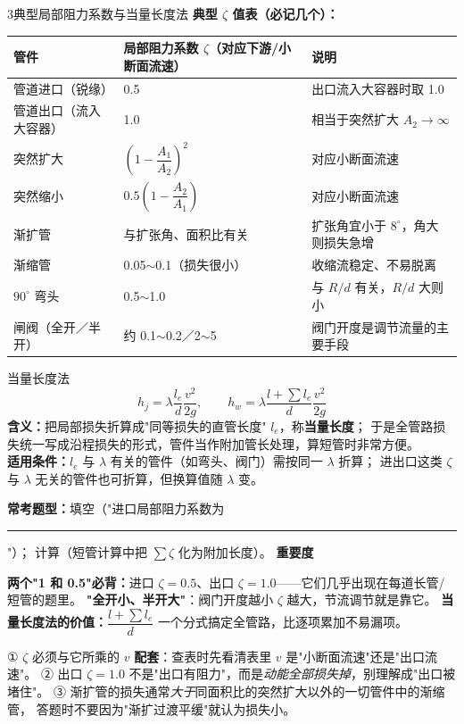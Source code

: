 \begin{kaodian}{3}{典型局部阻力系数与当量长度法}
\textbf{典型 $\zeta$ 值表（必记几个）：}
\begin{center}
\begin{tabularx}{\textwidth}{@{}lXX@{}}
\toprule
管件 & 局部阻力系数 $\zeta$（对应下游/小断面流速） & 说明 \\
\midrule
管道进口（锐缘） & 0.5 & 出口流入大容器时取 1.0 \\
管道出口（流入大容器） & 1.0 & 相当于突然扩大 $A_2\to\infty$ \\
突然扩大 & $\left(1-\dfrac{A_1}{A_2}\right)^2$ & 对应小断面流速 \\
突然缩小 & $0.5\left(1-\dfrac{A_2}{A_1}\right)$ & 对应小断面流速 \\
渐扩管 & 与扩张角、面积比有关 & 扩张角宜小于 $8^\circ$，角大则损失急增 \\
渐缩管 & 0.05$\sim$0.1（损失很小） & 收缩流稳定、不易脱离 \\
$90^\circ$ 弯头 & 0.5$\sim$1.0 & 与 $R/d$ 有关，$R/d$ 大则小 \\
闸阀（全开／半开） & 约 0.1$\sim$0.2／2$\sim$5 & 阀门开度是调节流量的主要手段 \\
\bottomrule
\end{tabularx}
\end{center}

\begin{gongshi}{当量长度法}
\[ h_j=\lambda\frac{l_e}{d}\frac{v^2}{2g},\qquad
   h_w=\lambda\frac{l+\sum l_e}{d}\frac{v^2}{2g} \]
\textbf{含义：}把局部损失折算成"同等损失的直管长度" $l_e$，称\textbf{当量长度}；
于是全管路损失统一写成沿程损失的形式，管件当作附加管长处理，算短管时非常方便。\\
\textbf{适用条件：}$l_e$ 与 $\lambda$ 有关的管件（如弯头、阀门）需按同一 $\lambda$ 折算；
进出口这类 $\zeta$ 与 $\lambda$ 无关的管件也可折算，但换算值随 $\lambda$ 变。
\end{gongshi}

\textbf{常考题型：}填空（"进口局部阻力系数为\rule{1.2cm}{0.4pt}"）；
计算（短管计算中把 $\sum\zeta$ 化为附加长度）。
\textbf{重要度 }\quad{}\quad{}

\begin{banfa}
\textbf{两个"1 和 0.5"必背：}进口 $\zeta=0.5$、出口 $\zeta=1.0$——它们几乎出现在每道长管/短管的题里。
\textbf{"全开小、半开大"}：阀门开度越小 $\zeta$ 越大，节流调节就是靠它。
\textbf{当量长度法的价值：}$\dfrac{l+\sum l_e}{d}$ 一个分式搞定全管路，比逐项累加不易漏项。
\end{banfa}

\begin{yicuo}
① $\zeta$ 必须与它所乘的 $v$ \textbf{配套}：查表时先看清表里 $v$ 是"小断面流速"还是"出口流速"。
② 出口 $\zeta=1.0$ 不是"出口有阻力"，而是\emph{动能全部损失掉}，别理解成"出口被堵住"。
③ 渐扩管的损失通常\emph{大于}同面积比的突然扩大以外的一切管件中的渐缩管，
答题时不要因为"渐扩过渡平缓"就认为损失小。
\end{yicuo}
\end{kaodian}

